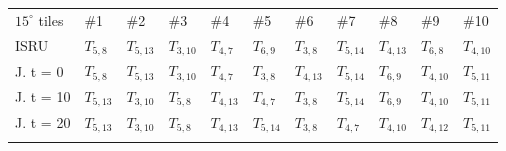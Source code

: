 \documentclass[utf8]{FrontiersinHarvard} %
\begin{document}
\begin{table}[h!]
\centering
\begin{tabular}{lllllllllll}
$15^{\circ}$ tiles & \#1                                  & \#2                                  & \#3                                  & \#4                                  & \#5                                  & \#6                                  & \#7                                  & \#8                                  & \#9                                  & \#10                                 \\
ISRU               & \cellcolor[HTML]{00FF00}$T_{5,8}$    & \cellcolor[HTML]{88FF00}$T_{5,13}$   & \cellcolor[HTML]{B8FF00}$T_{3,10}$   & \cellcolor[HTML]{E8FF00}$T_{4,7}$    & \cellcolor[HTML]{FFFF00}$T_{6,9}$    & \cellcolor[HTML]{FFEE00}$T_{3,8}$    & \cellcolor[HTML]{FFDD00}$T_{5,14}$   & \cellcolor[HTML]{FFCC00}$T_{4,13}$   & \cellcolor[HTML]{FFBB00}$T_{6,8}$    & \cellcolor[HTML]{FFAA00}$T_{4,10}$   \\
J. t = 0           & \cellcolor[HTML]{00FF00}$T_{5,8}$    & \cellcolor[HTML]{88FF00}$T_{5,13}$   & \cellcolor[HTML]{B8FF00}$T_{3,10}$   & \cellcolor[HTML]{E8FF00}$T_{4,7}$    & \cellcolor[HTML]{FFEE00}$T_{3,8}$    & \cellcolor[HTML]{FFCC00}$T_{4,13}$   & \cellcolor[HTML]{FFDD00}$T_{5,14}$   & \cellcolor[HTML]{FFFF00}$T_{6,9}$    & \cellcolor[HTML]{FFAA00}$T_{4,10}$   & $T_{5,11}$                           \\
J. t = 10          & \cellcolor[HTML]{88FF00}$T_{5,13}$   & \cellcolor[HTML]{B8FF00}$T_{3,10}$   & \cellcolor[HTML]{00FF00}$T_{5,8}$    & \cellcolor[HTML]{FFCC00}$T_{4,13}$   & \cellcolor[HTML]{E8FF00}$T_{4,7}$    & \cellcolor[HTML]{FFEE00}$T_{3,8}$    & \cellcolor[HTML]{FFDD00}$T_{5,14}$   & \cellcolor[HTML]{FFFF00}$T_{6,9}$    & \cellcolor[HTML]{FFAA00}$T_{4,10}$   & $T_{5,11}$                           \\
J. t = 20          & \cellcolor[HTML]{88FF00}$T_{5,13}$   & \cellcolor[HTML]{B8FF00}$T_{3,10}$   & \cellcolor[HTML]{00FF00}$T_{5,8}$    & \cellcolor[HTML]{FFCC00}$T_{4,13}$   & \cellcolor[HTML]{FFDD00}$T_{5,14}$   & \cellcolor[HTML]{FFEE00}$T_{3,8}$    & \cellcolor[HTML]{E8FF00}$T_{4,7}$    & \cellcolor[HTML]{FFAA00}$T_{4,10}$   & $T_{4,12}$                           & $T_{5,11}$                           \\
                   &                                      &                                      &                                      &                                      &                                      &                                      &                                      &                                      &                                      &                                      \\

\end{tabular}
\end{table}
\end{document}
